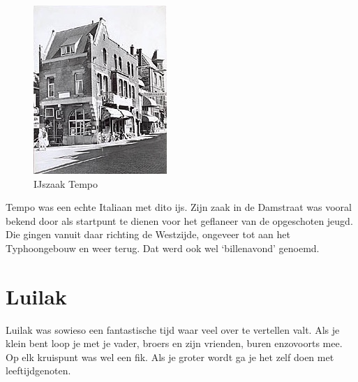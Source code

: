 \documentclass[12pt,twoside]{memoir}
\begin{document}
\begin{figure}
\includegraphics[width=\textwidth]{img/ch8/Tempo}
\caption*{\footnotesize IJszaak Tempo}
\end{figure}

Tempo was een echte Italiaan met dito ijs. Zijn zaak in de Damstraat was vooral bekend door als startpunt te dienen voor het geflaneer van de opgeschoten jeugd.  Die gingen vanuit daar richting de Westzijde, ongeveer tot aan het Typhoongebouw en weer terug. Dat werd ook wel ‘billenavond’ genoemd. 

\chapter{Luilak} %
\label{cha:luilak}

Luilak was sowieso een fantastische tijd waar veel over te vertellen valt. Als je klein bent loop je met je vader, broers en zijn vrienden, buren enzovoorts mee. Op elk kruispunt was wel een fik. Als je groter wordt ga je het zelf doen met leeftijdgenoten. 
\end{document}
